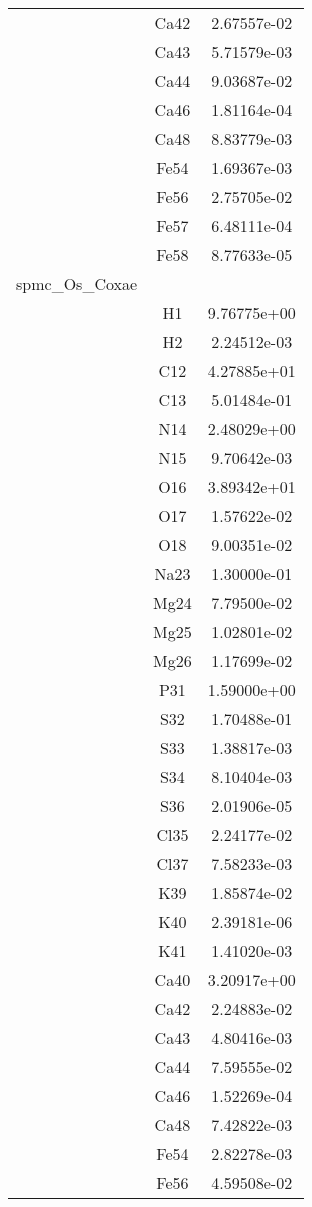 \begin{centering}
\begin{longtable}{l c c}
& Ca42 & 2.67557e-02 \\ 
& Ca43 & 5.71579e-03 \\ 
& Ca44 & 9.03687e-02 \\ 
& Ca46 & 1.81164e-04 \\ 
& Ca48 & 8.83779e-03 \\ 
& Fe54 & 1.69367e-03 \\ 
& Fe56 & 2.75705e-02 \\ 
& Fe57 & 6.48111e-04 \\ 
& Fe58 & 8.77633e-05 \\ 
\hline
spmc\_Os\_Coxae & & \\
\hline
& H1 & 9.76775e+00 \\ 
& H2 & 2.24512e-03 \\ 
& C12 & 4.27885e+01 \\ 
& C13 & 5.01484e-01 \\ 
& N14 & 2.48029e+00 \\ 
& N15 & 9.70642e-03 \\ 
& O16 & 3.89342e+01 \\ 
& O17 & 1.57622e-02 \\ 
& O18 & 9.00351e-02 \\ 
& Na23 & 1.30000e-01 \\ 
& Mg24 & 7.79500e-02 \\ 
& Mg25 & 1.02801e-02 \\ 
& Mg26 & 1.17699e-02 \\ 
& P31 & 1.59000e+00 \\ 
& S32 & 1.70488e-01 \\ 
& S33 & 1.38817e-03 \\ 
& S34 & 8.10404e-03 \\ 
& S36 & 2.01906e-05 \\ 
& Cl35 & 2.24177e-02 \\ 
& Cl37 & 7.58233e-03 \\ 
& K39 & 1.85874e-02 \\ 
& K40 & 2.39181e-06 \\ 
& K41 & 1.41020e-03 \\ 
& Ca40 & 3.20917e+00 \\ 
& Ca42 & 2.24883e-02 \\ 
& Ca43 & 4.80416e-03 \\ 
& Ca44 & 7.59555e-02 \\ 
& Ca46 & 1.52269e-04 \\ 
& Ca48 & 7.42822e-03 \\ 
& Fe54 & 2.82278e-03 \\ 
& Fe56 & 4.59508e-02 \\ 

\end{longtable}
\end{centering}
